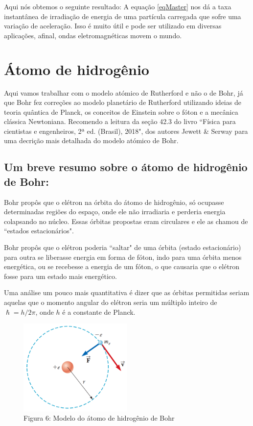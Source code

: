 \documentclass[12pt, letterpaper]{article}
\begin{document}
    Aqui nós obtemos o seguinte resultado: A equação \ref{eqMaster} nos dá a taxa instantânea de irradiação de energia de uma partícula carregada que sofre uma variação de aceleração. Isso é muito útil e pode ser utilizado em diversas aplicações, afinal, ondas eletromagnéticas movem o mundo.

\newpage
\section{Átomo de hidrogênio}

    Aqui vamos trabalhar com o modelo atómico de Rutherford e não o de Bohr, já que Bohr fez correções ao modelo planetário de Rutherford utilizando ideias de teoria quântica de Planck, os conceitos de Einstein sobre o fóton e a mecânica clássica Newtoniana. Recomendo a leitura da seção 42.3 do livro ``Física para cientistas e engenheiros, 2ª ed. (Brasil), 2018", dos autores Jewett \& Serway para uma decrição mais detalhada do modelo atómico de Bohr.

    \subsection{Um breve resumo sobre o átomo de hidrogênio de Bohr:}

    Bohr propôs que o elétron na órbita do átomo de hidrogênio, só ocupasse determinadas regiões do espaço, onde ele não irradiaria e perderia energia colapsando no núcleo. Essas órbitas propostas eram circulares e ele as chamou de ``estados estacionários".

    Bohr propôs que o elétron poderia ``saltar" de uma órbita (estado estacionário) para outra se liberasse energia em forma de fóton, indo para uma órbita menos energética, ou se recebesse a energia de um fóton, o que causaria que o elétron fosse para um estado mais energético.

    Uma análise um pouco mais quantitativa é dizer que as órbitas permitidas seriam aquelas que o momento angular do elétron seria um múltiplo inteiro de $\hslash = h/2\pi$, onde $h$ é a constante de Planck.

    \begin{figure}[h]
        \centering
        \includegraphics[width=0.5\textwidth]{bohr}
        \\{Figura 6: Modelo do átomo de hidrogênio de Bohr}
        \label{fig:bohr}
    \end{figure}
\end{document}
